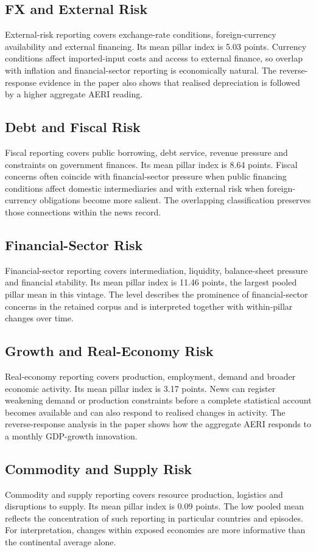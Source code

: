 \documentclass[11pt]{article}
\begin{document}
\subsection{FX and External Risk}
External-risk reporting covers exchange-rate conditions, foreign-currency availability and external financing. Its mean pillar index is 5.03 points. Currency conditions affect imported-input costs and access to external finance, so overlap with inflation and financial-sector reporting is economically natural. The reverse-response evidence in the paper also shows that realised depreciation is followed by a higher aggregate AERI reading.

\subsection{Debt and Fiscal Risk}
Fiscal reporting covers public borrowing, debt service, revenue pressure and constraints on government finances. Its mean pillar index is 8.64 points. Fiscal concerns often coincide with financial-sector pressure when public financing conditions affect domestic intermediaries and with external risk when foreign-currency obligations become more salient. The overlapping classification preserves those connections within the news record.

\subsection{Financial-Sector Risk}
Financial-sector reporting covers intermediation, liquidity, balance-sheet pressure and financial stability. Its mean pillar index is 11.46 points, the largest pooled pillar mean in this vintage. The level describes the prominence of financial-sector concerns in the retained corpus and is interpreted together with within-pillar changes over time.

\subsection{Growth and Real-Economy Risk}
Real-economy reporting covers production, employment, demand and broader economic activity. Its mean pillar index is 3.17 points. News can register weakening demand or production constraints before a complete statistical account becomes available and can also respond to realised changes in activity. The reverse-response analysis in the paper shows how the aggregate AERI responds to a monthly GDP-growth innovation.

\subsection{Commodity and Supply Risk}
Commodity and supply reporting covers resource production, logistics and disruptions to supply. Its mean pillar index is 0.09 points. The low pooled mean reflects the concentration of such reporting in particular countries and episodes. For interpretation, changes within exposed economies are more informative than the continental average alone.
\end{document}
